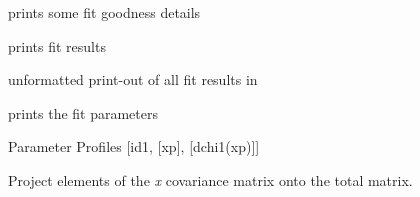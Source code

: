 \documentclass[a4paper,10pt,english]{sphinxmanual}
\begin{document}
\begin{fulllineitems}
\begin{fulllineitems}
\end{fulllineitems}


\begin{fulllineitems}
\label{index:kafe.fit.Fit.print_fit_details}
prints some fit goodness details

\end{fulllineitems}


\begin{fulllineitems}
\label{index:kafe.fit.Fit.print_fit_results}
prints fit results

\end{fulllineitems}


\begin{fulllineitems}
\label{index:kafe.fit.Fit.print_raw_results}
unformatted print-out of all fit results in

\end{fulllineitems}


\begin{fulllineitems}
\label{index:kafe.fit.Fit.print_rounded_fit_parameters}
prints the fit parameters

\end{fulllineitems}


\begin{fulllineitems}
\label{index:kafe.fit.Fit.profiles}
Parameter Profiles {[}id1, {[}xp{]}, {[}dchi1(xp){]}{]}

\end{fulllineitems}


\begin{fulllineitems}
\label{index:kafe.fit.Fit.project_x_covariance_matrix}
Project elements of the \emph{x} covariance matrix onto the total
matrix.


\end{fulllineitems}
\end{fulllineitems}
\end{document}
